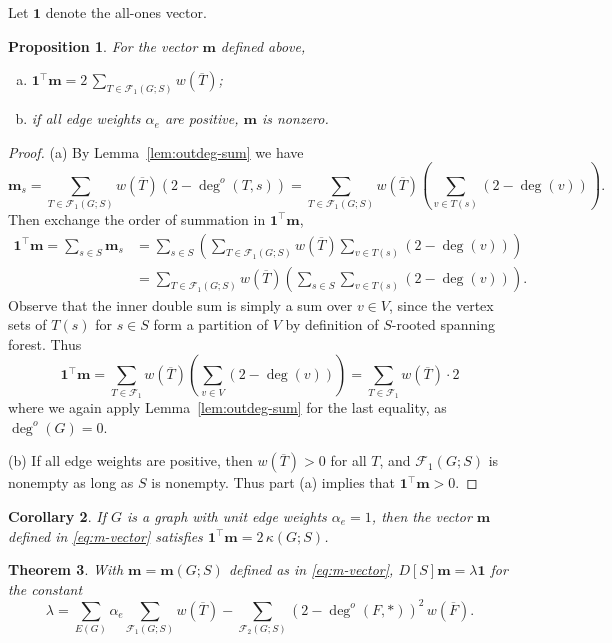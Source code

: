 \documentclass{amsart}
\newtheorem{thm}{Theorem}
\newtheorem{prop}[thm]{Proposition}
\newtheorem{cor}[thm]{Corollary}
\theoremstyle{definition}
\newcommand{\bone}{\mathbf{1}}
\newcommand{\boldm}{\mathbf{m}}
\newcommand{\tr}{\intercal}
\newcommand{\trees}{\mathcal{F}_1}
\newcommand{\forests}{\mathcal{F}}
\newcommand{\degout}{\deg^o}
\begin{document}
Let $\bone$ denote the all-ones vector.
\begin{prop}
\label{prop:m-sum}
For the vector $\boldm$ defined above, 
\begin{enumerate}[(a)]
\item 
$\displaystyle \bone^\tr \boldm = 2 \,\sum_{T \in \trees(G;S)} w(\overline{T})$;

\item 
if all edge weights $\alpha_e$ are positive, $\boldm$ is nonzero.
\end{enumerate}
\end{prop}
\begin{proof}
(a)
By Lemma~\ref{lem:outdeg-sum} we have
\[
\boldm_s = \sum_{T \in \trees(G;S)} w(\overline{T}) (2 - \degout (T,s))
= \sum_{T \in \trees(G;S)} w(\overline{T}) \left( \sum_{v \in T(s)}(2 - \deg(v))\right).
\]
Then exchange the order of summation in $\bone^\tr \boldm$,
\begin{align}
	\bone^\tr \boldm = \sum_{s\in S} \boldm_s &= \sum_{s \in S} \left( \sum_{T \in \trees(G;S)} w(\overline{T}) \sum_{v \in T(s)}(2 - \deg(v)) \right) \\
	&= \sum_{T \in \trees(G;S)} w(\overline{T}) \left( \sum_{s\in S} \sum_{v \in T(s)} (2 - \deg(v)) \right) .
\end{align}
Observe that the inner double sum is simply a sum over $v \in V$,
since the vertex sets of $T(s)$ for $s \in S$ form a partition of $V$ by definition of $S$-rooted spanning forest.
Thus 
\[
	\bone^\tr \boldm = \sum_{T \in \trees} w(\overline{T}) \left( \sum_{v \in V} (2 - \deg(v))\right)
	= \sum_{T \in \trees} w(\overline{T}) \cdot 2 
\]
where we again apply Lemma~\ref{lem:outdeg-sum} for the last equality, as $\degout(G) = 0$.

(b) 
If all edge weights are positive, then $w(\overline{T}) > 0$ for all $T$, and $\trees(G; S)$ is nonempty as long as $S$ is nonempty. 
Thus part (a) implies that $\bone^\tr \boldm > 0$.
\end{proof}

\begin{cor}
If $G$ is a graph with unit edge weights $\alpha_e = 1$, then the vector $\boldm$ defined in \eqref{eq:m-vector} satisfies $\bone^\tr \boldm = 2\, \kappa(G;S)$.
\end{cor}

\begin{thm}
\label{thm:m-distance-product}
With $\boldm = \boldm(G;S)$ defined as in \eqref{eq:m-vector},
$D[S] \boldm = \lambda \mathbf{1}$
for the constant
\begin{equation}
\label{eq:lambda}
	\lambda = \sum_{E(G)} \alpha_e \sum_{\trees(G;S)} w(\overline{T}) - \sum_{\forests_2(G;S)} (2 - \degout(F,*) )^2 \, w(\overline{F}) .
\end{equation}
\end{thm}
\end{document}
